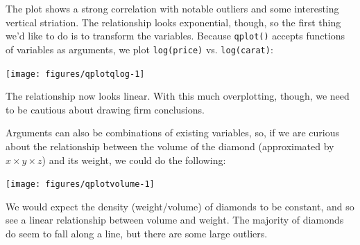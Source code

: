 The plot shows a strong correlation with notable outliers and some
interesting vertical striation. The relationship looks exponential,
though, so the first thing we'd like to do is to transform the
variables. Because \texttt{qplot()} accepts functions of variables as
arguments, we plot \texttt{log(price)} vs. \texttt{log(carat)}:

\begin{Shaded}
\begin{Highlighting}[]
\NormalTok{>}\StringTok{ }\NormalTok{(} 
\end{Highlighting}
\end{Shaded}

\begin{flushleft}\texttt{[image: figures/qplotqlog-1]} \end{flushleft}

\noindent The relationship now looks linear. With this much
overplotting, though, we need to be cautious about drawing firm
conclusions.

Arguments can also be combinations of existing variables, so, if we are
curious about the relationship between the volume of the diamond
(approximated by $x \times y \times z$) and its weight, we could do the
following:

\begin{Shaded}
\begin{Highlighting}[]
\NormalTok{>}\StringTok{ }\StringTok{ }\StringTok{ } 
\end{Highlighting}
\end{Shaded}

\begin{flushleft}\texttt{[image: figures/qplotvolume-1]} \end{flushleft}

We would expect the density (weight/volume) of diamonds to be constant,
and so see a linear relationship between volume and weight. The majority
of diamonds do seem to fall along a line, but there are some large
outliers.


